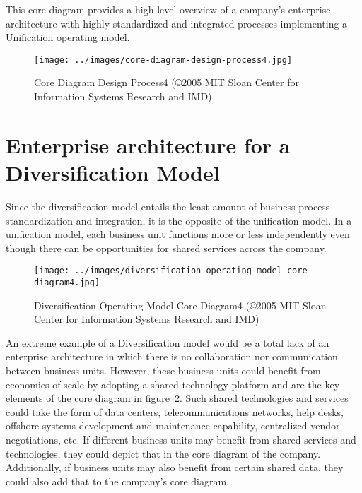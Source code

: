 This core diagram provides a high-level overview of a company's enterprise architecture with highly standardized and
integrated processes implementing a Unification operating model.

\begin{figure}[ht]
    \centering
    \texttt{[image: ../images/core-diagram-design-process4.jpg]}
    \caption{Core Diagram Design Process4 (©2005 MIT Sloan Center for Information Systems Research and IMD)}
    \label{fig:ekgmm-ea-core-diagram-design-process4}
\end{figure}

\section*{Enterprise architecture for a Diversification Model}

Since the diversification model entails the least amount of business process standardization and integration,
it is the opposite of the unification model.
In a unification model, each business unit functions more or less independently even though there can be opportunities
for shared services across the company.

\begin{figure}[ht]
    \centering
    \texttt{[image: ../images/diversification-operating-model-core-diagram4.jpg]}
    \caption{Diversification Operating Model Core Diagram4 (©2005 MIT Sloan Center for Information Systems Research and IMD)}
    \label{fig:ekgmm-ea-diversification-operating-model-core-diagram4}
\end{figure}

An extreme example of a Diversification model would be a total lack of an enterprise architecture in which there is
no collaboration nor communication between business units.
However, these business units could benefit from economies of scale by adopting a shared technology platform and
are the key elements of the core diagram in figure~\ref{fig:ekgmm-ea-diversification-operating-model-core-diagram4}.
Such shared technologies and services could take the form of data centers, telecommunications networks,
help desks, offshore systems development and maintenance capability, centralized vendor negotiations, etc.
If different business units may benefit from shared services and technologies, they could depict that in the
core diagram of the company.\newline
Additionally, if business units may also benefit from certain shared data, they could also add that to the company's
core diagram.


